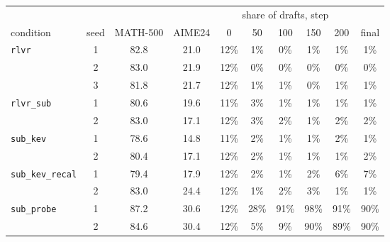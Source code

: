 \begin{tabular}{@{}lccccccccc@{}}
\toprule
& & & & \multicolumn{5}{c}{share of drafts, step} & \\ \cmidrule(lr){5-9}
condition & seed & MATH-500 & AIME24 & 0 & 50 & 100 & 150 & 200 & final \\ \midrule
\texttt{rlvr} & 1 & 82.8 & 21.0 & 12\% & 1\% & 0\% & 1\% & 1\% & 1\% \\
 & 2 & 83.0 & 21.9 & 12\% & 0\% & 0\% & 0\% & 0\% & 0\% \\
 & 3 & 81.8 & 21.7 & 12\% & 1\% & 1\% & 0\% & 1\% & 1\% \\
\addlinespace
\texttt{rlvr\_sub} & 1 & 80.6 & 19.6 & 11\% & 3\% & 1\% & 1\% & 1\% & 1\% \\
 & 2 & 83.0 & 17.1 & 12\% & 3\% & 2\% & 1\% & 2\% & 2\% \\
\addlinespace
\texttt{sub\_kev} & 1 & 78.6 & 14.8 & 11\% & 2\% & 1\% & 1\% & 2\% & 1\% \\
 & 2 & 80.4 & 17.1 & 12\% & 2\% & 1\% & 1\% & 1\% & 2\% \\
\addlinespace
\texttt{sub\_kev\_recal} & 1 & 79.4 & 17.9 & 12\% & 2\% & 1\% & 2\% & 6\% & 7\% \\
 & 2 & 83.0 & 24.4 & 12\% & 1\% & 2\% & 3\% & 1\% & 1\% \\
\addlinespace
\texttt{sub\_probe} & 1 & 87.2 & 30.6 & 12\% & 28\% & 91\% & 98\% & 91\% & 90\% \\
 & 2 & 84.6 & 30.4 & 12\% & 5\% & 9\% & 90\% & 89\% & 90\% \\
\bottomrule
\end{tabular}
